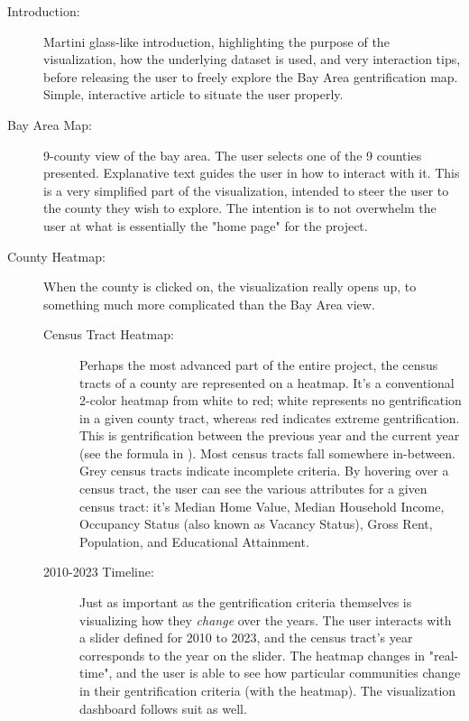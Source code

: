 \documentclass{article}
\begin{document}
\begin{description}

    \item[Introduction:] Martini glass-like introduction, highlighting the purpose of the visualization, how the underlying dataset is used, and very interaction tips, before releasing the user to freely explore the Bay Area gentrification map. Simple, interactive article to situate the user properly.
    
    \item[Bay Area Map:] 9-county view of the bay area. The user selects one of the 9 counties presented. Explanative text guides the user in how to interact with it. This is a very simplified part of the visualization, intended to steer the user to the county they wish to explore. The intention is to not overwhelm the user at what is essentially the "home page" for the project.
    
    \item[County Heatmap:] When the county is clicked on, the visualization really opens up, to something much more complicated than the Bay Area view.
    
    \begin{description}
    
        \item[Census Tract Heatmap:] Perhaps the most advanced part of the entire project, the census tracts of a county are represented on a heatmap. It's a conventional 2-color heatmap from white to red; white represents no gentrification in a given county tract, whereas red indicates extreme gentrification. This is gentrification between the previous year and the current year (see the formula in ). Most census tracts fall somewhere in-between. Grey census tracts indicate incomplete criteria. By hovering over a census tract, the user can see the various attributes for a given census tract: it's Median Home Value, Median Household Income, Occupancy Status (also known as Vacancy Status), Gross Rent, Population, and Educational Attainment. 
        
        \item[2010-2023 Timeline:] Just as important as the gentrification criteria themselves is visualizing how they \textit{change} over the years. The user interacts with a slider defined for 2010 to 2023, and the census tract's year corresponds to the year on the slider. The heatmap changes in "real-time", and the user is able to see how particular communities change in their gentrification criteria (with the heatmap). The visualization dashboard follows suit as well.
        

\end{description}
\end{description}
\end{document}
